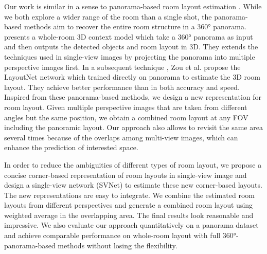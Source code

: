 %
Our work is similar in a sense to panorama-based room layout estimation \cite{zhang2014panocontext,zou2018layoutnet}. While we both explore a wider range of the room than a single shot, the panorama-based methods aim to recover the entire room structure in a \ang{360} panorama. 
%
\cite{zhang2014panocontext} presents a whole-room 3D context model which take a \ang{360} panorama as input and then outputs the detected objects and room layout in 3D. 
They extends the techniques used in single-view images by projecting the panorama into multiple perspective images first. 
In a subsequent technique \cite{zou2018layoutnet}, Zou et al. propose the LayoutNet network which trained directly on panorama to estimate the 3D room layout. They achieve better performance than \cite{zhang2014panocontext} in both accuracy and speed.
%
Inspired from these panorama-based methods, we design a new representation for room layout. Given multiple perspective images that are taken from different angles but the same position, we obtain a combined room layout at any FOV including the panoramic layout. Our approach also allows to revisit the same area several times because of the overlaps among multi-view images, which can enhance the prediction of interested space.

%
In order to reduce the ambiguities of different types of room layout, we propose a concise corner-based representation of room layouts in single-view image and design a single-view network (SVNet) to estimate these new corner-based layouts. 
The new representations are easy to integrate.
We combine the estimated room layouts from different perspectives and generate a combined room layout using weighted average in the overlapping area. 
The final results look reasonable and impressive. 
We also evaluate our approach quantitatively on a panorama dataset and achieve comparable performance on whole-room layout with full \ang{360}-panorama-based methods without losing the flexibility.   

